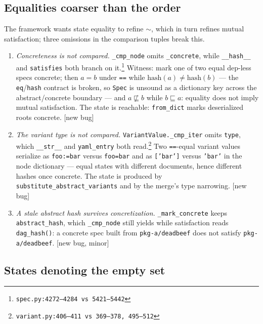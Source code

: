 \documentclass[11pt]{article}
\theoremstyle{definition}
\theoremstyle{remark}
\newcommand{\sat}{\sqsubseteq}
\renewcommand{\ker}{\sim}
\newcommand{\code}[1]{\texttt{#1}}
\newcommand{\src}[1]{\footnote{\code{#1}}}
\begin{document}
\subsection{Equalities coarser than the order}\label{sec:audit-eq}

The framework wants state equality to refine $\ker$, which in turn refines
mutual satisfaction; three omissions in the comparison tuples break this.

\begin{enumerate}[itemsep=3pt]
\item \emph{Concreteness is not compared.}  \code{\_cmp\_node} omits
\code{\_concrete}, while \code{\_\_hash\_\_} and \code{satisfies} both branch
on it.\src{spec.py:4272--4284 vs 5421--5442}  Witness: mark one of two equal
dep-less specs concrete; then $a = b$ under \code{==} while
$\mathrm{hash}(a) \neq \mathrm{hash}(b)$ --- the \code{eq}/\code{hash}
contract is broken, so \code{Spec} is unsound as a dictionary key across the
abstract/concrete boundary --- and $a \not\sat b$ while $b \sat a$: equality
does not imply mutual satisfaction.  The state is reachable:
\code{from\_dict} marks deserialized roots concrete.  [new bug]
\item \emph{The variant type is not compared.}  \code{VariantValue.\_cmp\_iter}
omits \code{type}, which \code{\_\_str\_\_} and \code{yaml\_entry} both
read.\src{variant.py:406--411 vs 369--378, 495--512}  Two \code{==}-equal
variant values serialize as \code{foo:=bar} versus \code{foo=bar} and as
\code{['bar']} versus \code{'bar'} in the node dictionary --- equal states
with different documents, hence different hashes once concrete.  The state is
produced by \code{substitute\_abstract\_variants} and by the merge's type
narrowing.  [new bug]
\item \emph{A stale abstract hash survives concretization.}
\code{\_mark\_concrete} keeps \code{abstract\_hash}, which \code{\_cmp\_node}
still yields while satisfaction reads \code{dag\_hash()}: a concrete spec
built from \code{pkg-a/deadbeef} does not satisfy \code{pkg-a/deadbeef}.
[new bug, minor]
\end{enumerate}

\subsection{States denoting the empty set}\label{sec:audit-empty}
\end{document}
